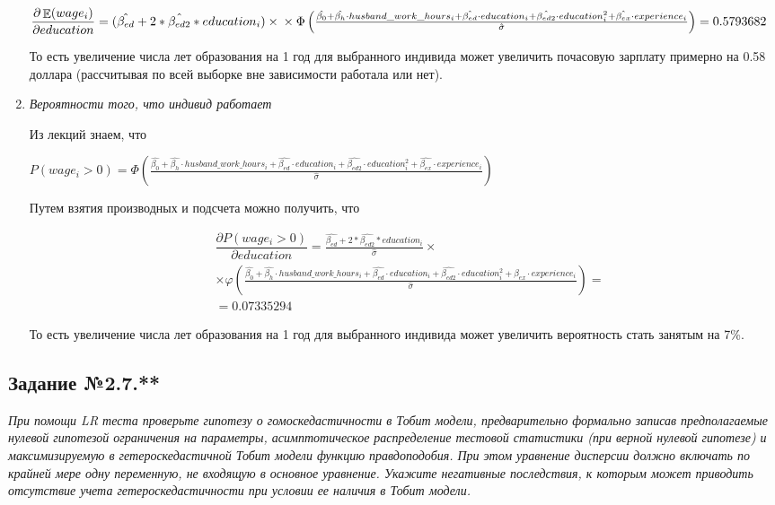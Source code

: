 \documentclass[a4paper,12pt]{article}
\DeclareMathOperator{\EX}{\mathbb{E}}%
\begin{document}
\begin{enumerate}[label=\Alph*)]
	$
		\dfrac{\partial \EX (wage_i)}{\partial education}=(\hat{\beta_{ed}}+2* \hat{\beta_{ed2} }*education_i)\times \\ \times\Phi \left(\frac{\hat{\beta_0} + \hat{\beta_h}\cdot husband\_work\_hours_i +\hat{\beta_{ed} }\cdot education_i + \hat{\beta_{ed2} }\cdot education_i^2 + \hat{\beta_{ex}}\cdot experience_i  }{\hat{\sigma} }\right)
		= 0.5793682 
	$

	То есть увеличение числа лет образования на 1 год для выбранного индивида может увеличить почасовую зарплату примерно на 0.58 доллара (рассчитывая по всей выборке вне зависимости работала или нет).
	
	\item \textit{Вероятности того, что индивид работает}
	
	Из лекций знаем, что 
	
	$
		P(wage_i>0) = \Phi \left(\frac{\hat{\beta_0} + \hat{\beta_h}\cdot husband\_work\_hours_i +\hat{\beta_{ed} }\cdot education_i + \hat{\beta_{ed2} }\cdot education_i^2 + \hat{\beta_{ex}}\cdot experience_i  }{\hat{\sigma} }\right)
	$
	
	Путем взятия производных и подсчета можно получить, что 
	
	\begin{align*}
			&\dfrac{\partial  P(wage_i>0)}{\partial education}=\frac{\hat{\beta_{ed}}+2* \hat{\beta_{ed2} }*education_i}{\hat{\sigma}}\times \\ &\times
			\varphi \left(\frac{\hat{\beta_0} + \hat{\beta_h}\cdot husband\_work\_hours_i +\hat{\beta_{ed} }\cdot education_i + \hat{\beta_{ed2} }\cdot education_i^2 + \hat{\beta_{ex}}\cdot experience_i }{\hat{\sigma} }\right)=\\
			&= 0.07335294 
	\end{align*}

	То есть увеличение числа лет образования на 1 год для выбранного индивида может увеличить вероятность стать занятым на 7\%.
	
	
\end{enumerate}


\subsection{Задание №2.7.**}
\textit{При помощи LR теста проверьте гипотезу о гомоскедастичности в Тобит
модели, предварительно формально записав предполагаемые нулевой гипотезой
ограничения на параметры, асимптотическое распределение тестовой статистики (при
верной нулевой гипотезе) и максимизируемую в гетероскедастичной Тобит модели
функцию правдоподобия. При этом уравнение дисперсии должно включать по крайней
мере одну переменную, не входящую в основное уравнение. Укажите негативные
последствия, к которым может приводить отсутствие учета гетероскедастичности при
условии ее наличия в Тобит модели.}
\end{document}
